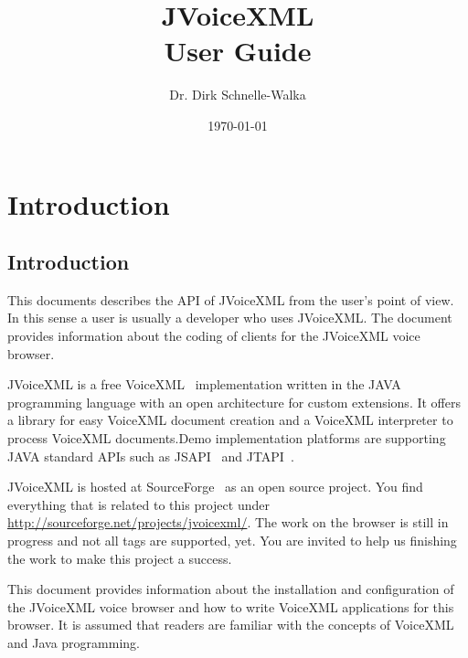\documentclass[11pt,a4paper]{book}
\title{JVoiceXML \jvxmlversion \\ User Guide}
\author{Dr. Dirk Schnelle-Walka}
\date{\today}
\begin{document}
\pagestyle{empty}

\maketitle


\pagestyle{headings}

\tableofcontents

\newpage

\listoffigures

\newpage

\listoftables

\newpage
{}

\chapter{Introduction}
\section{Introduction}
\label{sec:introduction}

This documents describes the API of JVoiceXML from the user's point of
view. In this sense a user is usually a developer who uses JVoiceXML. The
document provides information about the coding of clients for the JVoiceXML
voice browser.

JVoiceXML is a free VoiceXML~\cite{w3.org:voicexml} implementation written in 
the JAVA programming language with an open architecture for custom
extensions. It offers a library for easy VoiceXML
document creation and a VoiceXML interpreter to process 
VoiceXML documents.Demo implementation platforms are supporting JAVA standard
APIs such as JSAPI~\cite{sun:jsapi} and JTAPI~\cite{sun:jsapi}.

JVoiceXML is hosted at SourceForge~\cite{sourceforge} as an open source project.
You find everything that is related to this project under
\url{http://sourceforge.net/projects/jvoicexml/}.
The work on the browser is still in progress and not all tags are
supported, yet. You are invited to help us finishing the work to make this
project a success.

This document provides information about the installation and
configuration of the JVoiceXML voice browser and how to write
VoiceXML applications for this browser.
It is assumed that readers are familiar with the concepts of
VoiceXML and Java programming.
\end{document}
